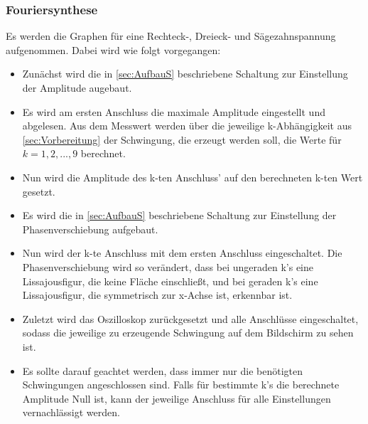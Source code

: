 \subsubsection{Fouriersynthese}

Es werden die Graphen für eine Rechteck-, Dreieck- und Sägezahnspannung
aufgenommen. Dabei wird wie folgt vorgegangen:

\begin{itemize}

  \item Zunächst wird die in \ref{sec:AufbauS} beschriebene Schaltung zur
  Einstellung der Amplitude augebaut.

  \item Es wird am ersten Anschluss die maximale Amplitude eingestellt und
  abgelesen. Aus dem Messwert werden über die jeweilige k-Abhängigkeit aus
  \ref{sec:Vorbereitung} der
  Schwingung, die erzeugt werden soll, die Werte für $k=1,2,...,9$ berechnet.

  \item Nun wird die Amplitude des k-ten Anschluss' auf den berechneten k-ten
  Wert gesetzt.

  \item Es wird die in \ref{sec:AufbauS} beschriebene Schaltung zur Einstellung
  der Phasenverschiebung aufgebaut.

  \item Nun wird der k-te Anschluss mit dem ersten Anschluss eingeschaltet.
  Die Phasenverschiebung wird so verändert, dass bei ungeraden k's eine
  Lissajousfigur, die keine Fläche einschließt, und bei geraden k's
  eine Lissajousfigur, die symmetrisch zur x-Achse ist, erkennbar ist.

  \item Zuletzt wird das Oszilloskop zurückgesetzt und alle Anschlüsse
  eingeschaltet, sodass die jeweilige zu erzeugende Schwingung auf dem
  Bildschirm zu sehen ist.

  \item Es sollte darauf geachtet werden, dass immer nur die benötigten
  Schwingungen angeschlossen sind. Falls für bestimmte k's die berechnete
  Amplitude Null ist, kann der jeweilige Anschluss für alle Einstellungen
  vernachlässigt werden.

\end{itemize}
